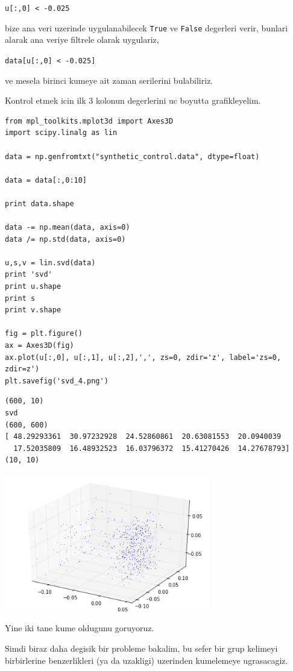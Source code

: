 \documentclass[12pt,fleqn]{article}\usepackage{../common}
\begin{document}
\verb!u[:,0] < -0.025!

bize ana veri uzerinde uygulanabilecek \verb!True! ve \verb!False!
degerleri verir, bunlari alarak ana veriye filtrele olarak uygulariz,

\verb!data[u[:,0] < -0.025]!

ve mesela birinci kumeye ait zaman serilerini bulabiliriz. 

Kontrol etmek icin ilk 3 kolonun degerlerini uc boyutta grafikleyelim.

\begin{verbatim}
from mpl_toolkits.mplot3d import Axes3D
import scipy.linalg as lin

data = np.genfromtxt("synthetic_control.data", dtype=float)

data = data[:,0:10]

print data.shape

data -= np.mean(data, axis=0)
data /= np.std(data, axis=0)

u,s,v = lin.svd(data)
print 'svd'
print u.shape
print s
print v.shape

fig = plt.figure()
ax = Axes3D(fig)
ax.plot(u[:,0], u[:,1], u[:,2],',', zs=0, zdir='z', label='zs=0, zdir=z')
plt.savefig('svd_4.png')
\end{verbatim}

\begin{verbatim}
(600, 10)
svd
(600, 600)
[ 48.29293361  30.97232928  24.52860861  20.63081553  20.0940039
  17.52035809  16.48932523  16.03796372  15.41270426  14.27678793]
(10, 10)
\end{verbatim}

\includegraphics[height=6cm]{svd_4.png}

Yine iki tane kume oldugunu goruyoruz. 

Simdi biraz daha degisik bir probleme bakalim, bu sefer bir grup kelimeyi
birbirlerine benzerlikleri (ya da uzakligi) uzerinden kumelemeye ugrasacagiz. 
\end{document}
